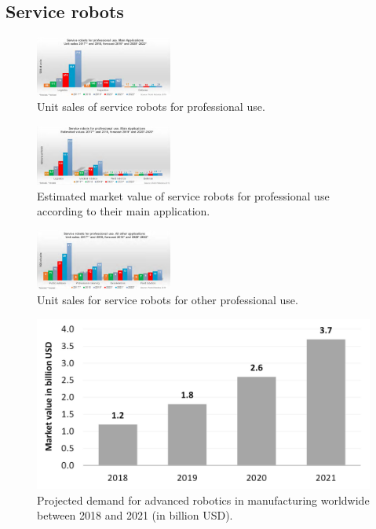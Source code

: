 \begin{appendices}
\section{Service robots}
\begin{figure}[h]
	\centering
	\includegraphics[width=0.4\textwidth]{fig/service_robots_professional_use_main_app_sales}
	\caption{Unit sales of service robots for professional use.}
	\label{fig:service_robots_professional_use_main_app_sales}
\end{figure}

\begin{figure}[h]
	\centering
	\includegraphics[width=0.4\textwidth]{fig/service_robots_professional_main_app_value}
	\caption{Estimated market value of service robots for professional use according to their main application.}
	\label{fig:service_robots_professional_main_app_value}
\end{figure}

\begin{figure}[h]
	\centering
	\includegraphics[width=0.4\textwidth]{fig/service_robots_professional_use_main_other_sales}
	\caption{Unit sales for service robots for other professional use.}
	\label{fig:service_robots_professional_use_main_other_sales}
\end{figure}
	
	\begin{figure}[!t]
		\centering
		\includegraphics[width= 0.9\columnwidth]{fig/advanced_robots_in_manufacturing_projected_global_demand}
		\caption{Projected demand for advanced robotics in manufacturing worldwide between 2018 and 2021 (in billion USD).}
		\label{fig:advanced_robots_in_manufacturing_projected_global_demand}
	\end{figure}	
\end{appendices}

